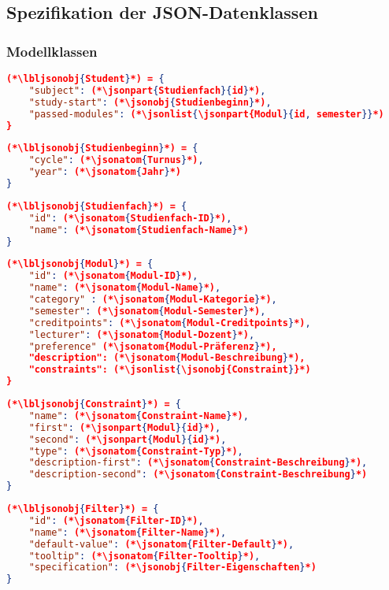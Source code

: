 \FloatBarrier
\subsection{Spezifikation der JSON-Datenklassen}

\subsubsection*{Modellklassen}

\begin{lstlisting}[language=json]
(*\lbljsonobj{Student}*) = {
	"subject": (*\jsonpart{Studienfach}{id}*),
	"study-start": (*\jsonobj{Studienbeginn}*),
	"passed-modules": (*\jsonlist{\jsonpart{Modul}{id, semester}}*)
}
\end{lstlisting}

\begin{lstlisting}[language=json]
(*\lbljsonobj{Studienbeginn}*) = {
	"cycle": (*\jsonatom{Turnus}*),
	"year": (*\jsonatom{Jahr}*)
}
\end{lstlisting}

\begin{lstlisting}[language=json]	
(*\lbljsonobj{Studienfach}*) = {
	"id": (*\jsonatom{Studienfach-ID}*),
	"name": (*\jsonatom{Studienfach-Name}*)
}
\end{lstlisting}


\begin{lstlisting}[language=json]
(*\lbljsonobj{Modul}*) = {
	"id": (*\jsonatom{Modul-ID}*),
	"name": (*\jsonatom{Modul-Name}*),
	"category" : (*\jsonatom{Modul-Kategorie}*),
	"semester": (*\jsonatom{Modul-Semester}*),
	"creditpoints": (*\jsonatom{Modul-Creditpoints}*),
	"lecturer": (*\jsonatom{Modul-Dozent}*),
	"preference" (*\jsonatom{Modul-Präferenz}*),
	"description": (*\jsonatom{Modul-Beschreibung}*),	
	"constraints": (*\jsonlist{\jsonobj{Constraint}}*)
}
\end{lstlisting}

\begin{lstlisting}[language=json]
(*\lbljsonobj{Constraint}*) = {
	"name": (*\jsonatom{Constraint-Name}*),
	"first": (*\jsonpart{Modul}{id}*),
	"second": (*\jsonpart{Modul}{id}*),
	"type": (*\jsonatom{Constraint-Typ}*),
	"description-first": (*\jsonatom{Constraint-Beschreibung}*),
	"description-second": (*\jsonatom{Constraint-Beschreibung}*)	
}
\end{lstlisting}

\begin{lstlisting}[language=json]
(*\lbljsonobj{Filter}*) = {
	"id": (*\jsonatom{Filter-ID}*),
	"name": (*\jsonatom{Filter-Name}*),
	"default-value": (*\jsonatom{Filter-Default}*),
	"tooltip": (*\jsonatom{Filter-Tooltip}*),
	"specification": (*\jsonobj{Filter-Eigenschaften}*)
}
\end{lstlisting}


